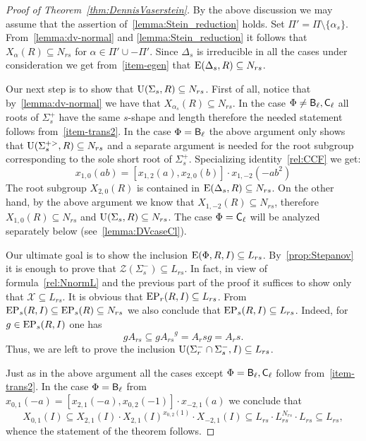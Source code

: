 \begin{proof}[Proof of Theorem~\ref{thm:DennisVaserstein}]
By the above discussion we may assume that the assertion of~\cref{lemma:Stein_reduction} holds.
Set $\Pi' = \Pi \setminus \{\alpha_s\}$.
From~\cref{lemma:dv-normal} and \cref{lemma:Stein_reduction} it follows that $X_\alpha(R) \subseteq N_{rs}$ for $\alpha \in \Pi' \cup -\Pi'$.
Since $\Delta_s$ is irreducible in all the cases under consideration we get from~\cref{item-egen} that $\operatorname{E}(\Delta_s, R) \subseteq N_{rs}$.

Our next step is to show that $\operatorname{U}(\Sigma_s, R) \subseteq N_{rs}$.
First of all, notice that by~\cref{lemma:dv-normal} we have that $X_{\alpha_s}(R) \subseteq N_{rs}$.
In the case $\Phi\neq \mathsf{B}_\ell, \mathsf{C}_\ell$ all roots of $\Sigma^+_s$ have the same $s$-shape and length therefore the needed statement follows from~\cref{item-trans2}.
In the case $\Phi=\mathsf{B}_\ell$ the above argument only shows that $\operatorname{U}(\Sigma_s^{+>}, R) \subseteq N_{rs}$ and a separate argument is needed for the root subgroup corresponding to the sole short root of $\Sigma_s^+$.
Specializing identity~\eqref{rel:CCF} we get:
\begin{equation*} \label{rel:CCF-specBC} x_{1,0}(ab) = [x_{1, 2}(a), x_{2, 0}(b)] \cdot x_{1,-2}(-a b^2) \end{equation*}
The root subgroup $X_{2, 0}(R)$ is contained in $\operatorname{E}(\Delta_s, R) \subseteq N_{rs}$.
On the other hand, by the above argument we know that $X_{1,-2}(R) \subseteq N_{rs}$, therefore $X_{1,0}(R) \subseteq N_{rs}$ and $\operatorname{U}(\Sigma_s, R) \subseteq N_{rs}$.
The case $\Phi=\mathsf{C}_\ell$ will be analyzed separately below (see~\cref{lemma:DVcaseCl}).

Our ultimate goal is to show the inclusion $\operatorname{E}(\Phi, R, I) \subseteq L_{rs}$. 
By~\cref{prop:Stepanov} it is enough to prove that $\mathcal{Z}(\Sigma^-_s) \subseteq L_{rs}$.
In fact, in view of formula~\eqref{rel:NnormL} and the previous part of the proof it suffices to show only that $\mathcal{X} \subseteq L_{rs}$.
It is obvious that $\operatorname{EP}_r(R, I) \subseteq L_{rs}$.
From $\operatorname{EP}_s(R, I) \subseteq \operatorname{EP}_s(R) \subseteq N_{rs}$ we also conclude that $\operatorname{EP}_s(R, I) \subseteq L_{rs}$. Indeed, for $g\in\operatorname{EP}_s(R,I)$ one has
\[ gA_{rs} \subseteq g {A_{rs}}^g = A_rs g = A_rs. \]
Thus, we are left to prove the inclusion $\operatorname{U}(\Sigma^-_r \cap \Sigma^-_s, I) \subseteq L_{rs}$.

Just as in the above argument all the cases except $\Phi = \mathsf{B}_\ell, \mathsf{C}_\ell$ follow from~\cref{item-trans2}.
In the case $\Phi=\mathsf{B}_\ell$ from $x_{0, 1}(-a) = [x_{2,1}(-a), x_{0, 2}(-1)]\cdot x_{-2,1}(a)$ we conclude that
$$X_{0,1}(I) \subseteq X_{2,1}(I) \cdot X_{2,1}(I)^{x_{0,2}(1)} \cdot X_{-2,1}(I) \subseteq L_{rs} \cdot L_{rs}^{N_{rs}} \cdot L_{rs} \subseteq L_{rs},$$
whence the statement of the theorem follows. \end{proof}

